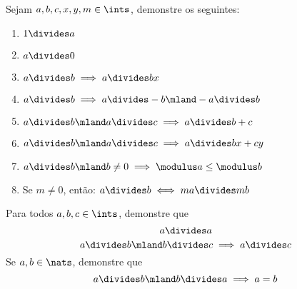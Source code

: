 \begin{exercise}
    Sejam $a, b, c, x, y, m \in \ints$, demonstre os seguintes:

    \begin{enumerate}[(1)]
        \item $1 \divides a$
        \item $a \divides 0$
        \item $a \divides b \implies a \divides bx$
        \item $a \divides b \implies a \divides -b \mland -a \divides b$
        \item $a \divides b \mland a \divides c \implies a \divides b + c$
        \item $a \divides b \mland a \divides c \implies a \divides bx + cy$
        \item $a \divides b \mland b \neq 0 \implies \modulus a \leq \modulus b$
        \item Se $m \neq 0$, então: $a \divides b \iff ma \divides mb$
    \end{enumerate}
\end{exercise}

\begin{exercise}
    Para todos $a, b, c \in \ints$, demonstre que
    $$
    a \divides a
    $$
    $$
    a \divides b \mland b \divides c \implies a \divides c
    $$
    Se $a, b \in \nats$, demonstre que
    $$
    a \divides b \mland b \divides a \implies a = b
    $$
\end{exercise}
